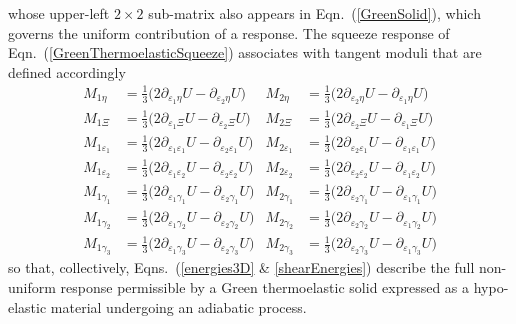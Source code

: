 \normalsize
whose upper-left $2\times 2$ sub-matrix also appears in Eqn.~(\ref{GreenSolid}), which governs the uniform contribution of a response.  The squeeze response of Eqn.~(\ref{GreenThermoelasticSqueeze}) associates with tangent moduli that are defined accordingly
\begin{subequations}  
    \label{shearEnergies}
    \begin{align}
    M_{1\eta} & = \tfrac{1}{3} \bigl( 2 \partial_{\varepsilon_1 \eta} U -
        \partial_{\varepsilon_2 \eta} U \bigr) &
    M_{2\eta} & = \tfrac{1}{3} \bigl( 2 \partial_{\varepsilon_2 \eta} U -
    \partial_{\varepsilon_1 \eta} U \bigr) \\
    M_{1\Xi} & = \tfrac{1}{3} \bigl( 2 \partial_{\varepsilon_1 \Xi} U -
    \partial_{\varepsilon_2 \Xi} U \bigr) &
    M_{2\Xi} & = \tfrac{1}{3} \bigl( 2 \partial_{\varepsilon_2 \Xi} U -
    \partial_{\varepsilon_1 \Xi} U \bigr) \\
    M_{1\varepsilon_1} & = \tfrac{1}{3} \bigl( 2 \partial_{\varepsilon_1 \varepsilon_1} U -
    \partial_{\varepsilon_2 \varepsilon_1} U \bigr) & 
    M_{2\varepsilon_1} & = \tfrac{1}{3} \bigl( 2 \partial_{\varepsilon_2 \varepsilon_1} U -
    \partial_{\varepsilon_1 \varepsilon_1} U \bigr) \\
    M_{1\varepsilon_2} & = \tfrac{1}{3} \bigl( 2 \partial_{\varepsilon_1 \varepsilon_2} U -
    \partial_{\varepsilon_2 \varepsilon_2} U \bigr) & 
    M_{2\varepsilon_2} & = \tfrac{1}{3} \bigl( 2 \partial_{\varepsilon_2 \varepsilon_2} U -
    \partial_{\varepsilon_1 \varepsilon_2} U \bigr) \\
    M_{1\gamma_1} & = \tfrac{1}{3} \bigl( 2 \partial_{\varepsilon_1 \gamma_1} U -
    \partial_{\varepsilon_2 \gamma_1} U \bigr) &
    M_{2\gamma_1} & = \tfrac{1}{3} \bigl( 2 \partial_{\varepsilon_2 \gamma_1} U -
    \partial_{\varepsilon_1 \gamma_1} U \bigr) \\
    M_{1\gamma_2} & = \tfrac{1}{3} \bigl( 2 \partial_{\varepsilon_1 \gamma_2} U -
    \partial_{\varepsilon_2 \gamma_2} U \bigr) &
    M_{2\gamma_2} & = \tfrac{1}{3} \bigl( 2 \partial_{\varepsilon_2 \gamma_2} U -
    \partial_{\varepsilon_1 \gamma_2} U \bigr) \\
    M_{1\gamma_3} & = \tfrac{1}{3} \bigl( 2 \partial_{\varepsilon_1 \gamma_3} U -
    \partial_{\varepsilon_2 \gamma_3} U \bigr) &
    M_{2\gamma_3} & = \tfrac{1}{3} \bigl( 2 \partial_{\varepsilon_2 \gamma_3} U -
    \partial_{\varepsilon_1 \gamma_3} U \bigr)
    \end{align}
\end{subequations}
so that, collectively, Eqns.~(\ref{energies3D} \& \ref{shearEnergies}) describe the full non-uniform response permissible by a Green thermo\-elastic solid expressed as a hypo-elastic material undergoing an adiabatic process.

